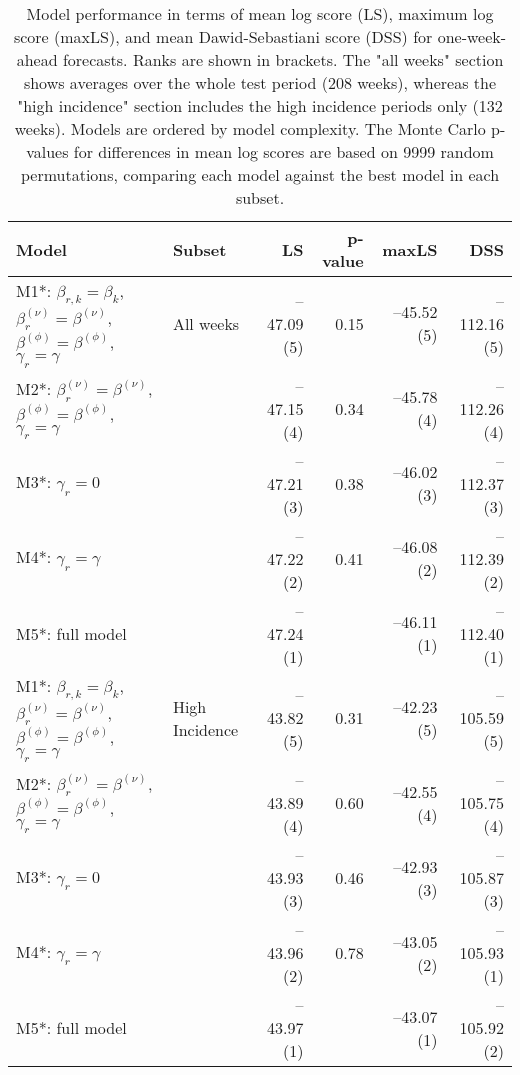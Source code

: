 \begin{table}[ht]
\centering
\begingroup\fontsize{9pt}{10pt}\selectfont
\begin{tabular}{ll|rrrr}
  \hline
Model & Subset & LS & p-value & maxLS & DSS \\ 
  \hline
M1*: $\beta_{r,k} = \beta_{k}$, $\beta_{r}^{(\nu)} = \beta^{(\nu)}$, $\beta^{(\phi)} = \beta^{(\phi)}$, $\gamma_r = \gamma$ & All weeks & --47.09 (5) & 0.15 & --45.52 (5) & --112.16 (5) \\ 
  M2*: $\beta_{r}^{(\nu)} = \beta^{(\nu)}$, $\beta^{(\phi)} = \beta^{(\phi)}$, $\gamma_r = \gamma$ &  & --47.15 (4) & 0.34 & --45.78 (4) & --112.26 (4) \\ 
  M3*: $\gamma_r = 0$ &  & --47.21 (3) & 0.38 & --46.02 (3) & --112.37 (3) \\ 
  M4*: $\gamma_r = \gamma$ &  & --47.22 (2) & 0.41 & --46.08 (2) & --112.39 (2) \\ 
  M5*: full model &  & --47.24 (1) &  & --46.11 (1) & --112.40 (1) \\ 
   \hline
M1*: $\beta_{r,k} = \beta_{k}$, $\beta_{r}^{(\nu)} = \beta^{(\nu)}$, $\beta^{(\phi)} = \beta^{(\phi)}$, $\gamma_r = \gamma$ & High Incidence & --43.82 (5) & 0.31 & --42.23 (5) & --105.59 (5) \\ 
  M2*: $\beta_{r}^{(\nu)} = \beta^{(\nu)}$, $\beta^{(\phi)} = \beta^{(\phi)}$, $\gamma_r = \gamma$ &  & --43.89 (4) & 0.60 & --42.55 (4) & --105.75 (4) \\ 
  M3*: $\gamma_r = 0$ &  & --43.93 (3) & 0.46 & --42.93 (3) & --105.87 (3) \\ 
  M4*: $\gamma_r = \gamma$ &  & --43.96 (2) & 0.78 & --43.05 (2) & --105.93 (1) \\ 
  M5*: full model &  & --43.97 (1) &  & --43.07 (1) & --105.92 (2) \\ 
   \hline
\end{tabular}
\endgroup
\caption{Model performance in terms of mean log score (LS),
             maximum log score (maxLS), and mean Dawid-Sebastiani score (DSS)
             for one-week-ahead forecasts.
             Ranks are shown in brackets.
             The "all weeks" section shows averages over the
             whole test period (208 weeks),
             whereas the "high incidence" section includes
             the high incidence periods only (132 weeks).
             Models are ordered by model complexity.
             The Monte Carlo p-values for differences in mean log scores
             are based on 9999 random permutations,
             comparing each model against the best model in each subset.} 
\label{tab:forecast}
\end{table}
